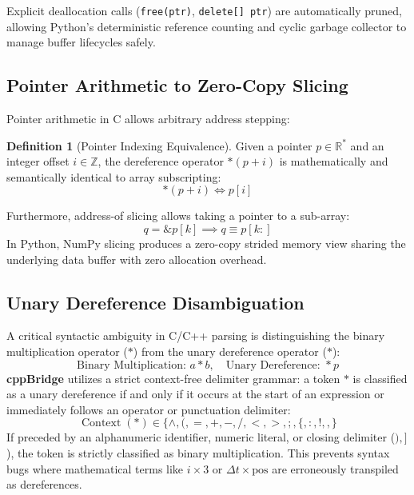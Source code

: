 \documentclass[11pt,a4paper]{article}
\theoremstyle{definition}
\newtheorem{definition}{Definition}[section]
\begin{document}
Explicit deallocation calls (\texttt{free(ptr)}, \texttt{delete[] ptr}) are automatically pruned, allowing Python's deterministic reference counting and cyclic garbage collector to manage buffer lifecycles safely.

\subsection{Pointer Arithmetic to Zero-Copy Slicing}

Pointer arithmetic in C allows arbitrary address stepping:
\begin{definition}[Pointer Indexing Equivalence]
Given a pointer $p \in \mathbb{R}^*$ and an integer offset $i \in \mathbb{Z}$, the dereference operator $\ast(p + i)$ is mathematically and semantically identical to array subscripting:
\begin{equation}
    \ast(p + i) \iff p[i]
\end{equation}
\end{definition}

Furthermore, address-of slicing allows taking a pointer to a sub-array:
\begin{equation}
    q = \&p[k] \implies q \equiv p[k:]
\end{equation}
In Python, NumPy slicing produces a zero-copy strided memory view sharing the underlying data buffer with zero allocation overhead.

\subsection{Unary Dereference Disambiguation}

A critical syntactic ambiguity in C/C++ parsing is distinguishing the binary multiplication operator ($\ast$) from the unary dereference operator ($\ast$):
\begin{equation}
    \text{Binary Multiplication: } a \ast b, \quad \text{Unary Dereference: } \ast p
\end{equation}
\textbf{cppBridge} utilizes a strict context-free delimiter grammar: a token $\ast$ is classified as a unary dereference if and only if it occurs at the start of an expression or immediately follows an operator or punctuation delimiter:
\begin{equation}
    \operatorname{Context}(\ast) \in \{ \wedge, (, =, +, -, /, <, >, ;, \{, :, !, , \}
\end{equation}
If preceded by an alphanumeric identifier, numeric literal, or closing delimiter ($), ]$), the token is strictly classified as binary multiplication. This prevents syntax bugs where mathematical terms like $i \times 3$ or $\Delta t \times \mathrm{pos}$ are erroneously transpiled as dereferences.
\end{document}
